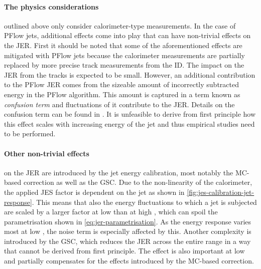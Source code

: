 \paragraph{The physics considerations} outlined above only consider calorimeter-type measurements.
In the case of PFlow jets, additional effects come into play that can have non-trivial effects on the JER.
First it should be noted that some of the aforementioned effects are mitigated with PFlow jets because the calorimeter measurements are partially replaced by more precise track measurements from the ID. 
The impact on the JER from the tracks is expected to be small.
However, an additional contribution to the PFlow JER comes from the sizeable amount of incorrectly subtracted energy in the PFlow algorithm.
This amount is captured in a term known as \emph{confusion term} and fluctuations of it contribute to the JER. Details on the confusion term can be found in . It is unfeasible to derive from first principle how this effect scales with increasing energy of the jet and thus empirical studies need to be performed.

\paragraph{Other non-trivial effects} on the JER are introduced by the jet energy calibration, most notably the MC-based correction as well as the GSC.
Due to the non-linearity of the calorimeter, the applied JES factor is dependent on the jet \pT as shown in \cref{fig:jes-calibration-jet-response}. This means that also the energy fluctuations to which a jet is subjected are scaled by a larger factor at low \pT than at high \pT, which can spoil the parametrisation shown in \cref{eq:jer-parametrisation}.
As the energy response varies most at low \pT, the noise term is especially affected by this.
Another complexity is introduced by the GSC, which reduces the JER across the entire \pT range in a way that cannot be derived from first principle. The effect is also important at low \pT and partially compensates for the effects introduced by the MC-based correction.

